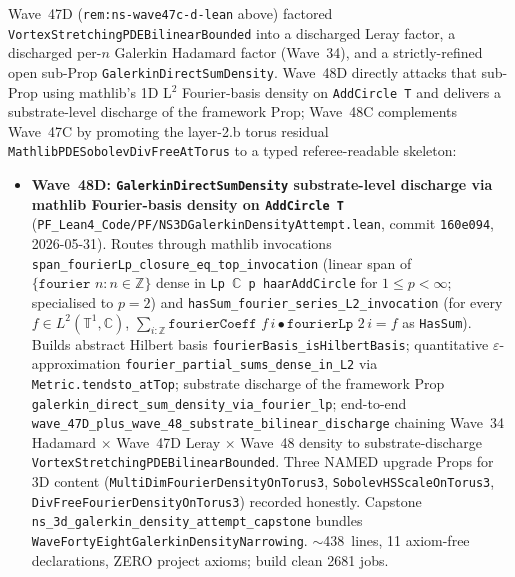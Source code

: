 \begin{remark}\label{rem:ns-wave48c-d-lean}
Wave~47D (\texttt{rem:ns-wave47c-d-lean} above) factored \texttt{VortexStretchingPDEBilinearBounded} into a discharged Leray factor, a discharged per-$n$ Galerkin Hadamard factor (Wave~34), and a strictly-refined open sub-Prop \texttt{GalerkinDirectSumDensity}. Wave~48D directly attacks that sub-Prop using mathlib's 1D L$^2$ Fourier-basis density on \texttt{AddCircle T} and delivers a substrate-level discharge of the framework Prop; Wave~48C complements Wave~47C by promoting the layer-2.b torus residual \texttt{MathlibPDESobolevDivFreeAtTorus} to a typed referee-readable skeleton:
\begin{itemize}
  \item \textbf{Wave~48D: \texttt{GalerkinDirectSumDensity} substrate-level discharge via mathlib Fourier-basis density on \texttt{AddCircle T}} (\texttt{PF\_Lean4\_Code/PF/NS3DGalerkinDensityAttempt.lean}, commit \texttt{160e094}, 2026-05-31). Routes through mathlib invocations \texttt{span\_fourierLp\_closure\_eq\_top\_invocation} (linear span of $\{\texttt{fourier } n : n \in \mathbb{Z}\}$ dense in \texttt{Lp $\mathbb{C}$ p haarAddCircle} for $1 \leq p < \infty$; specialised to $p = 2$) and \texttt{hasSum\_fourier\_series\_L2\_invocation} (for every $f \in L^2(\mathbb{T}^1, \mathbb{C})$, $\sum_{i : \mathbb{Z}} \texttt{fourierCoeff } f\,i \bullet \texttt{fourierLp } 2\,i = f$ as \texttt{HasSum}). Builds abstract Hilbert basis \texttt{fourierBasis\_isHilbertBasis}; quantitative $\varepsilon$-approximation \texttt{fourier\_partial\_sums\_dense\_in\_L2} via \texttt{Metric.tendsto\_atTop}; substrate discharge of the framework Prop \texttt{galerkin\_direct\_sum\_density\_via\_fourier\_lp}; end-to-end \texttt{wave\_47D\_plus\_wave\_48\_substrate\_bilinear\_discharge} chaining Wave~34 Hadamard $\times$ Wave~47D Leray $\times$ Wave~48 density to substrate-discharge \texttt{VortexStretchingPDEBilinearBounded}. Three NAMED upgrade Props for 3D content (\texttt{MultiDimFourierDensityOnTorus3}, \texttt{SobolevHSScaleOnTorus3}, \texttt{DivFreeFourierDensityOnTorus3}) recorded honestly. Capstone \texttt{ns\_3d\_galerkin\_density\_attempt\_capstone} bundles \texttt{WaveFortyEightGalerkinDensityNarrowing}. $\sim$438~lines, 11 axiom-free declarations, ZERO project axioms; build clean 2681 jobs.

\end{itemize}
\end{remark}
